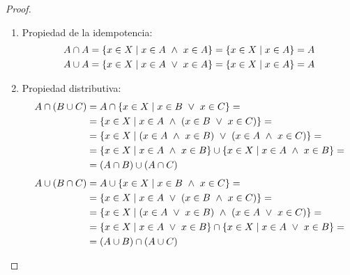 \begin{proof}
\begin{enumerate}
        \item Propiedad de la idempotencia:
        \begin{gather*}
            A \cap A = \{x \in X \mid x \in A \ \land \  x \in A\} = \{x \in X \mid x \in A\} = A \\
            A \cup A = \{x \in X \mid x \in A \ \lor \  x \in A\} = \{x \in X \mid x \in A\} = A
        \end{gather*}
        \item Propiedad distributiva:
        \begin{equation*}
            \begin{split}
                A \cap (B \cup C) &= A \cap \{x \in X \mid x \in B \ \lor \  x \in C\} =\\
                & =\{x \in X \mid x \in A \ \land \  (x \in B \ \lor \  x \in C)\} =\\
                & =\{x \in X \mid (x \in A \ \land \  x \in B) \ \lor \  (x \in A \ \land \  x \in C)\} =\\
                & = \{x \in X \mid x \in A \ \land \  x \in B\} \cup \{x \in X \mid x \in A \ \land \  x \in B\} =\\
                & = (A \cap B) \cup (A \cap C)
            \end{split}
        \end{equation*}
        \begin{equation*}
            \begin{split}
                A \cup (B \cap C) &= A \cup \{x \in X \mid x \in B \ \land \  x \in C\} =\\
                & =\{x \in X \mid x \in A \ \lor \  (x \in B \ \land \  x \in C)\} =\\
                & =\{x \in X \mid (x \in A \ \lor \  x \in B) \ \land \  (x \in A \ \lor \  x \in C)\} =\\
                &= \{x \in X \mid x \in A \ \lor \  x \in B\} \cap \{x \in X \mid x \in A \ \lor \  x \in B\} =\\
                &= (A \cup B) \cap (A \cup C)
            \end{split}
        \end{equation*}
    \end{enumerate}
\end{proof}

